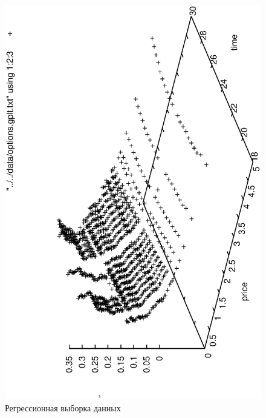 \documentclass[12pt,a4paper]{amsart}
\begin{document}
\begin{figure}[h]
  \includegraphics[scale=0.75,angle=-90]{figs/raw_data_2.eps}
  \caption{Регрессионная выборка данных}
  \label{fig:raw_data_2}
\end{figure}


\extrasrussian

\end{document}
